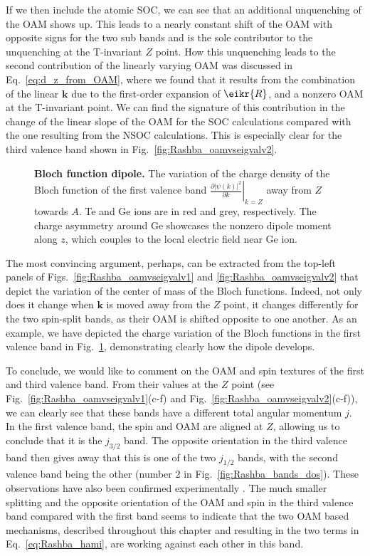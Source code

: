 If we then include the atomic SOC, we can see that an additional unquenching of the OAM shows up.
This leads to a nearly constant shift of the OAM with opposite signs for the two sub bands and is the sole contributor to the unquenching at the T-invariant $Z$ point.
How this unquenching leads to the second contribution of the linearly varying OAM was discussed in Eq.~\eqref{eq:d_z_from_OAM}, where we found that it results from the combination of the linear $\bm k$ due to the first-order expansion of $\eikr{R}$, and a nonzero OAM at the T-invariant point.
We can find the signature of this contribution in the change of the linear slope of the OAM for the SOC calculations compared with the one resulting from the NSOC calculations.
This is especially clear for the third valence band shown in Fig.~\ref{fig:Rashba_oamvseigvalv2}.
\begin{figure}
	\centering
{}
\caption{\label{fig:Rashba_diffdens}{\bf Bloch function dipole.} The variation of the charge density of the Bloch function of the first valence band $\left.\frac{\partial |\psi(k)|^2}{\partial k}\right\rvert_{k=Z}$ away from $Z$ towards $A$. Te and Ge ions are in red and grey, respectively. The charge asymmetry around Ge showcases the nonzero dipole moment along $z$, which couples to the local electric field near Ge ion.}
\end{figure}
    
The most convincing argument, perhaps, can be extracted from the top-left panels of Figs.~\ref{fig:Rashba_oamvseigvalv1} and \ref{fig:Rashba_oamvseigvalv2} that depict the variation of the center of mass of the Bloch functions. Indeed, not only does it change when $\bm k$ is moved away from the $Z$ point, it changes differently for the two spin-split bands, as their OAM is shifted opposite to one another.
As an example,  we have depicted the charge variation of the Bloch functions in the first valence band in Fig.~\ref{fig:Rashba_diffdens}, demonstrating clearly how the dipole develops.
    
To conclude, we would like to comment on the OAM and spin textures of the first and third valence band.
From their values at the $Z$ point (see Fig.~\ref{fig:Rashba_oamvseigvalv1}(c-f) and Fig.~\ref{fig:Rashba_oamvseigvalv2}(c-f)), we can clearly see that these bands have a different total angular momentum $j$.
In the first valence band, the spin and OAM are aligned at $Z$, allowing us to conclude that it is the $j_{3/2}$ band. The opposite orientation in the third valence band then gives away that this is one of the two $j_{1/2}$ bands, with the second valence band being the other (number 2 in Fig.~\ref{fig:Rashba_bands_dos}).
These observations have also been confirmed experimentally \cite{Krempasky2015,Krempasky2020}.
The much smaller splitting and the opposite orientation of the OAM and spin in the third valence band compared with the first band seems to indicate that the two OAM based mechanisms, described throughout this chapter and resulting in the two terms in Eq.~\eqref{eq:Rashba_hami}, are working against each other in this band.

